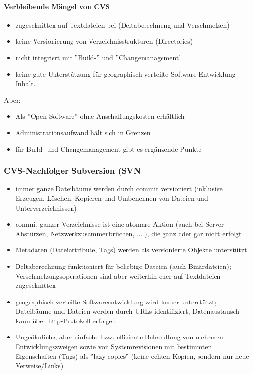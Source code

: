 \paragraph{Verbleibende Mängel von CVS}
\begin{itemize}
	\item zugeschnitten auf Textdateien bei (Deltaberechnung und Verschmelzen)
	\item keine Versionierung von Verzeichnisstrukturen (Directories)
	\item nicht integriert mit ''Build-'' und ''Changemanagement''
	\item keine gute Unterstützung für geographisch verteilte Software-Entwicklung
	Inhalt...
\end{itemize}
Aber:
\begin{itemize}
	\item Als ''Open Software'' ohne Anschaffungskosten erhältlich
	\item Administrationsaufwand hält sich in Grenzen
	\item für Build- und Changemanagement gibt es ergänzende Punkte
\end{itemize}
\subsubsection{CVS-Nachfolger Subversion (SVN}
\begin{itemize}
	\item immer ganze Dateibäume werden durch commit versioniert (inklusive Erzeugen, Löschen, Kopieren und Umbenennen von Dateien und Unterverzeichnissen)
	\item commit ganzer Verzeichnisse ist eine atomare Aktion (auch bei Server-Abstürzen, Netzwerkzusammenbrüchen, ... ), die ganz oder gar nicht erfolgt
	\item Metadaten (Dateiattribute, Tags) werden als versionierte Objekte unterstützt
	\item Deltaberechnung funktioniert für beliebige Dateien (auch Binärdateien); Verschmelzungsoperationen sind aber weiterhin eher auf Textdateien zugeschnitten
	\item geographisch verteilte Softwareentwicklung wird besser unterstützt; Dateibäume und Dateien werden durch URLs identifiziert, Datenaustausch kann über http-Protokoll erfolgen
	\item Ungeöhnliche, aber einfache bzw. effiziente Behandlung von mehreren Entwicklungszweigen sowie von Systemrevisionen mit bestimmten Eigenschaften (Tags) als ''lazy copies'' (keine echten Kopien, sondern nur neue Verweise/Links)
\end{itemize}

